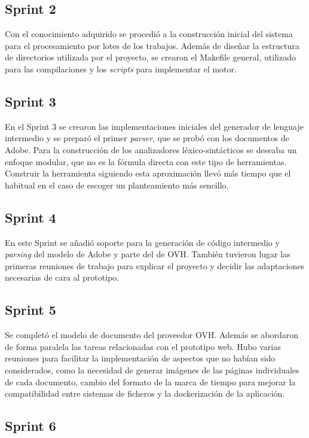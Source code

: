 \subsection{Sprint 2}

Con el conocimiento adquirido se procedió a la construcción inicial del sistema para el procesamiento por lotes de los trabajos. Además de diseñar la estructura de directorios utilizada por el proyecto, se crearon el Makefile general, utilizado para las compilaciones y los \emph{scripts} para implementar el motor.

\subsection{Sprint 3}

En el Sprint 3 se crearon las implementaciones iniciales del generador de lenguaje intermedio y se preparó el primer \emph{parser}, que se probó con los documentos de Adobe. Para la construcción de los analizadores léxico-sintácticos se deseaba un enfoque modular, que no es la fórmula directa con este tipo de herramientas. Construir la herramienta siguiendo esta aproximación llevó más tiempo que el habitual en el caso de escoger un planteamiento más sencillo.

\subsection{Sprint 4}

En este Sprint se añadió soporte para la generación de código intermedio y \emph{parsing} del modelo de Adobe y parte del de OVH. También tuvieron lugar las primeras reuniones de trabajo para explicar el proyecto y decidir las adaptaciones necesarias de cara al prototipo.

\subsection{Sprint 5}

Se completó el modelo de documento del proveedor OVH. Además se abordaron de forma paralela las tareas relacionadas con el prototipo web. Hubo varias reuniones para facilitar la implementación de aspectos que no habían sido considerados, como  la necesidad de generar imágenes de las páginas individuales de cada documento, cambio del formato de la marca de tiempo para mejorar la compatibilidad entre sistemas de ficheros y la dockerización de la aplicación.

\subsection{Sprint 6}

